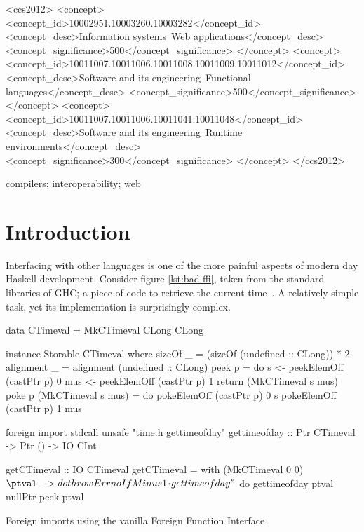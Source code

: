 \documentclass{sigplanconf}
\begin{document}

\begin{CCSXML}
<ccs2012>
<concept>
<concept_id>10002951.10003260.10003282</concept_id>
<concept_desc>Information systems~Web applications</concept_desc>
<concept_significance>500</concept_significance>
</concept>
<concept>
<concept_id>10011007.10011006.10011008.10011009.10011012</concept_id>
<concept_desc>Software and its engineering~Functional languages</concept_desc>
<concept_significance>500</concept_significance>
</concept>
<concept>
<concept_id>10011007.10011006.10011041.10011048</concept_id>
<concept_desc>Software and its engineering~Runtime environments</concept_desc>
<concept_significance>300</concept_significance>
</concept>
</ccs2012>
\end{CCSXML}


%
\printccsdesc
\keywords
compilers; interoperability; web

\section{Introduction}\label{sec:intro}
Interfacing with other languages is one of the more painful aspects of modern
day Haskell development. Consider figure \ref{lst:bad-ffi}, taken from the
standard libraries of GHC; a piece of code to retrieve the
current time\ \cite{time}. A relatively simple task, yet its implementation is
surprisingly complex.

\begin{listingfloat}
\begin{code}
data CTimeval = MkCTimeval CLong CLong

instance Storable CTimeval where
	sizeOf _ = (sizeOf (undefined :: CLong)) * 2
	alignment _ = alignment (undefined :: CLong)
	peek p = do
		s   <- peekElemOff (castPtr p) 0
		mus <- peekElemOff (castPtr p) 1
		return (MkCTimeval s mus)
	poke p (MkCTimeval s mus) = do
		pokeElemOff (castPtr p) 0 s
		pokeElemOff (castPtr p) 1 mus

foreign import stdcall unsafe "time.h gettimeofday"
   gettimeofday :: Ptr CTimeval -> Ptr () -> IO CInt

getCTimeval :: IO CTimeval
getCTimeval = with (MkCTimeval 0 0) $ \ptval -> do
  throwErrnoIfMinus1_ "gettimeofday" $ do
    gettimeofday ptval nullPtr
  peek ptval
\end{code}
\caption{Foreign imports using the vanilla Foreign Function Interface}
\label{lst:bad-ffi}
\end{listingfloat}
\end{document}
